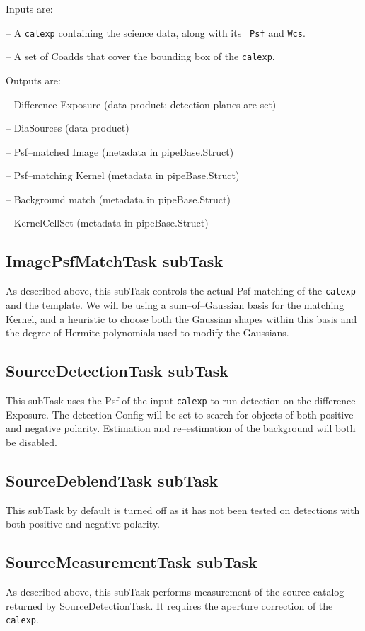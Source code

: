 \documentclass[12pt]{article}
\begin{document}
Inputs are:

-- A {\tt calexp} containing the science data, along with its {\tt
  Psf} and {\tt Wcs}.

-- A set of Coadds that cover the bounding box of the {\tt calexp}.

Outputs are:

-- Difference Exposure (data product; detection planes are set)

-- DiaSources (data product)

-- Psf--matched Image (metadata in pipeBase.Struct)

-- Psf--matching Kernel (metadata in pipeBase.Struct)

-- Background match (metadata in pipeBase.Struct)

-- KernelCellSet (metadata in pipeBase.Struct)

\subsection{ImagePsfMatchTask subTask}
As described above, this subTask controls the actual Psf-matching of
the {\tt calexp} and the template.  We will be using a
sum--of--Gaussian basis for the matching Kernel, and a heuristic to
choose both the Gaussian shapes within this basis and the degree of
Hermite polynomials used to modify the Gaussians.

\subsection{SourceDetectionTask subTask}
This subTask uses the Psf of the input {\tt calexp} to run detection
on the difference Exposure.  The detection Config will be set to
search for objects of both positive and negative polarity.  Estimation
and re--estimation of the background will both be disabled.

\subsection{SourceDeblendTask subTask}
This subTask by default is turned off as it has not been tested on detections
with both positive and negative polarity.

\subsection{SourceMeasurementTask subTask}
As described above, this subTask performs measurement of the source
catalog returned by SourceDetectionTask.  It requires the aperture
correction of the {\tt calexp}.
\end{document}

